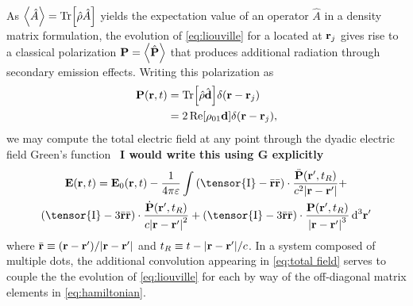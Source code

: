 As $\expval{\hat{A}} = \Tr[\hat{\rho}\hat{A}]$ yields the expectation value of an operator $\hat{A}$ in a density matrix formulation, the evolution of \cref{eq:liouville} for a \qd{} located at $\vb{r}_j$ gives rise to a classical polarization $\vb{P} = \expval{\hat{\vb{P}}}$ that produces additional radiation through secondary emission effects.
Writing this polarization as
\begin{equation}
  \begin{aligned}
    \vb{P}(\vb{r}, t) &= \Tr[\hat{\rho} \hat{\vb{d}}] \delta(\vb{r} - \vb{r}_j) \\
                      &= 2 \Re[\rho_{01}\vb{d}]\delta(\vb{r} - \vb{r}_j),
  \end{aligned}
\end{equation}
we may compute the total electric field at any point through the dyadic electric field Green's function~\cite{Rothwell2009} 
{\bf I would write this using G explicitly}
\begin{equation}
  \begin{gathered}
  \vb{E}(\vb{r}, t) = \vb{E}_0(\vb{r}, t) - \frac{1}{4\pi\varepsilon} \int
    \qty(\tensor{\mathrm{I}} - \bar{\vb{r}} \bar{\vb{r}}) \cdot \frac{\ddot{\vb{P}}(\vb{r}', t_R)}{c^2\abs{\vb{r} - \vb{r}'}} + \\
    \qty(\tensor{\mathrm{I}} - 3\bar{\vb{r}} \bar{\vb{r}}) \cdot \frac{\dot{\vb{P}}(\vb{r}', t_R)}{c\abs{\vb{r} - \vb{r}'}^2} +
    \qty(\tensor{\mathrm{I}} - 3\bar{\vb{r}} \bar{\vb{r}}) \cdot \frac{\vb{P}(\vb{r}', t_R)}{\abs{\vb{r} - \vb{r}'}^3}
  \dd[3]{\vb{r}'}
  \label{eq:total field}
  \end{gathered}
\end{equation}
where $\bar{\vb{r}} \equiv \qty(\vb{r} - \vb{r}')/\abs{\vb{r} - \vb{r}'}$ and $t_R \equiv t - \abs{\vb{r} - \vb{r}'}/c$.
In a system composed of multiple dots, the additional convolution appearing in \cref{eq:total field} serves to couple the the evolution of \cref{eq:liouville} for each \qd{} by way of the off-diagonal matrix elements in \cref{eq:hamiltonian}.
